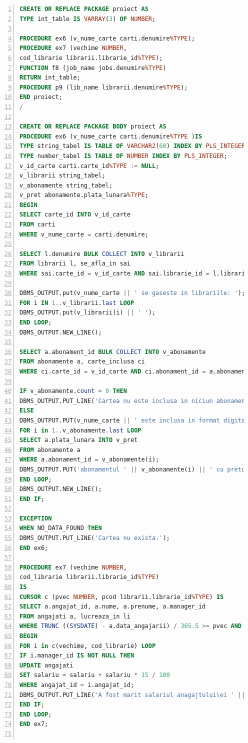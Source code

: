 \documentclass[12pt]{article}
\begin{document}
\begin{lstlisting}[language=SQL,
	showspaces=false,
	basicstyle=\ttfamily,
	numbers=left,
	numberstyle=\tiny,
	breaklines=true,
	commentstyle=\color{gray}]
CREATE OR REPLACE PACKAGE proiect AS
TYPE int_table IS VARRAY(3) OF NUMBER;

PROCEDURE ex6 (v_nume_carte carti.denumire%TYPE);
PROCEDURE ex7 (vechime NUMBER,
cod_librarie librarii.librarie_id%TYPE);
FUNCTION f8 (job_name jobs.denumire%TYPE)
RETURN int_table;
PROCEDURE p9 (lib_name librarii.denumire%TYPE);
END proiect;
/

CREATE OR REPLACE PACKAGE BODY proiect AS
PROCEDURE ex6 (v_nume_carte carti.denumire%TYPE )IS
TYPE string_tabel IS TABLE OF VARCHAR2(60) INDEX BY PLS_INTEGER;
TYPE number_tabel IS TABLE OF NUMBER INDEX BY PLS_INTEGER;
v_id_carte carti.carte_id%TYPE := NULL;
v_librarii string_tabel;
v_abonamente string_tabel;
v_pret abonamente.plata_lunara%TYPE;
BEGIN
SELECT carte_id INTO v_id_carte
FROM carti
WHERE v_nume_carte = carti.denumire;

SELECT l.denumire BULK COLLECT INTO v_librarii
FROM librarii l, se_afla_in sai
WHERE sai.carte_id = v_id_carte AND sai.librarie_id = l.librarie_id;

DBMS_OUTPUT.put(v_nume_carte || ' se gaseste in librariile: ');
FOR i IN 1..v_librarii.last LOOP
DBMS_OUTPUT.put(v_librarii(i) || ' ');
END LOOP;
DBMS_OUTPUT.NEW_LINE();

SELECT a.abonament_id BULK COLLECT INTO v_abonamente
FROM abonamente a, carte_inclusa ci
WHERE ci.carte_id = v_id_carte AND ci.abonament_id = a.abonament_id;

IF v_abonamente.count = 0 THEN
DBMS_OUTPUT.PUT_LINE('Cartea nu este inclusa in niciun abonament.');
ELSE
DBMS_OUTPUT.PUT(v_nume_carte || ' este inclusa in format digital in abonamentele: ');
FOR i in 1..v_abonamente.last LOOP
SELECT a.plata_lunara INTO v_pret
FROM abonamente a
WHERE a.abonament_id = v_abonamente(i);
DBMS_OUTPUT.PUT('abonamentul ' || v_abonamente(i) || ' cu pretul ' || v_pret || ', ');
END LOOP;
DBMS_OUTPUT.NEW_LINE();
END IF;

EXCEPTION 
WHEN NO_DATA_FOUND THEN
DBMS_OUTPUT.PUT_LINE('Cartea nu exista.');
END ex6;

PROCEDURE ex7 (vechime NUMBER,
cod_librarie librarii.librarie_id%TYPE)
IS
CURSOR c (pvec NUMBER, pcod librarii.librarie_id%TYPE) IS
SELECT a.angajat_id, a.nume, a.prenume, a.manager_id
FROM angajati a, lucreaza_in li
WHERE TRUNC ((SYSDATE) - a.data_angajarii) / 365.5 >= pvec AND li.angajat_id = a.angajat_id AND li.librarie_id = pcod;
BEGIN
FOR i in c(vechime, cod_librarie) LOOP
IF i.manager_id IS NOT NULL THEN
UPDATE angajati
SET salariu = salariu + salariu * 15 / 100
WHERE angajat_id = i.angajat_id;
DBMS_OUTPUT.PUT_LINE('A fost marit salariul anagajtului\ei ' || i.nume || ' ' || i.prenume || ' .');
END IF;
END LOOP;
END ex7;


\end{lstlisting}
\end{document}
